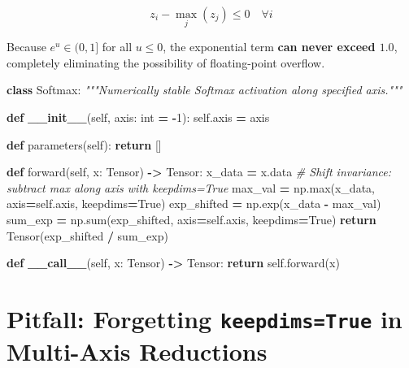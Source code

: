 \documentclass[
  letterpaper,
]{scrbook}
\newenvironment{Shaded}{\begin{snugshade}}{\end{snugshade}}
\newcommand{\BuiltInTok}[1]{#1}
\newcommand{\CommentTok}[1]{\textcolor[rgb]{0.56,0.35,0.01}{\textit{#1}}}
\newcommand{\ControlFlowTok}[1]{\textcolor[rgb]{0.13,0.29,0.53}{\textbf{#1}}}
\newcommand{\DecValTok}[1]{\textcolor[rgb]{0.00,0.00,0.81}{#1}}
\newcommand{\FunctionTok}[1]{\textcolor[rgb]{0.13,0.29,0.53}{\textbf{#1}}}
\newcommand{\KeywordTok}[1]{\textcolor[rgb]{0.13,0.29,0.53}{\textbf{#1}}}
\newcommand{\NormalTok}[1]{#1}
\newcommand{\OperatorTok}[1]{\textcolor[rgb]{0.81,0.36,0.00}{\textbf{#1}}}
\newcommand{\VariableTok}[1]{\textcolor[rgb]{0.00,0.00,0.00}{#1}}
\begin{document}
\[z_i - \max_j(z_j) \le 0 \quad \forall i\]

Because \(e^u \in (0, 1]\) for all \(u \le 0\), the exponential term
\textbf{can never exceed \(1.0\)}, completely eliminating the
possibility of floating-point overflow.

\begin{Shaded}
\begin{Highlighting}[]
\KeywordTok{class}\NormalTok{ Softmax:}
    \CommentTok{"""Numerically stable Softmax activation along specified axis."""}

    \KeywordTok{def} \FunctionTok{\_\_init\_\_}\NormalTok{(}\VariableTok{self}\NormalTok{, axis: }\BuiltInTok{int} \OperatorTok{=} \OperatorTok{{-}}\DecValTok{1}\NormalTok{):}
        \VariableTok{self}\NormalTok{.axis }\OperatorTok{=}\NormalTok{ axis}

    \KeywordTok{def}\NormalTok{ parameters(}\VariableTok{self}\NormalTok{):}
        \ControlFlowTok{return}\NormalTok{ []}

    \KeywordTok{def}\NormalTok{ forward(}\VariableTok{self}\NormalTok{, x: Tensor) }\OperatorTok{{-}\textgreater{}}\NormalTok{ Tensor:}
\NormalTok{        x\_data }\OperatorTok{=}\NormalTok{ x.data}
        \CommentTok{\# Shift invariance: subtract max along axis with keepdims=True}
\NormalTok{        max\_val }\OperatorTok{=}\NormalTok{ np.}\BuiltInTok{max}\NormalTok{(x\_data, axis}\OperatorTok{=}\VariableTok{self}\NormalTok{.axis, keepdims}\OperatorTok{=}\VariableTok{True}\NormalTok{)}
\NormalTok{        exp\_shifted }\OperatorTok{=}\NormalTok{ np.exp(x\_data }\OperatorTok{{-}}\NormalTok{ max\_val)}
\NormalTok{        sum\_exp }\OperatorTok{=}\NormalTok{ np.}\BuiltInTok{sum}\NormalTok{(exp\_shifted, axis}\OperatorTok{=}\VariableTok{self}\NormalTok{.axis, keepdims}\OperatorTok{=}\VariableTok{True}\NormalTok{)}
        \ControlFlowTok{return}\NormalTok{ Tensor(exp\_shifted }\OperatorTok{/}\NormalTok{ sum\_exp)}

    \KeywordTok{def} \FunctionTok{\_\_call\_\_}\NormalTok{(}\VariableTok{self}\NormalTok{, x: Tensor) }\OperatorTok{{-}\textgreater{}}\NormalTok{ Tensor:}
        \ControlFlowTok{return} \VariableTok{self}\NormalTok{.forward(x)}
\end{Highlighting}
\end{Shaded}

\section{\texorpdfstring{Pitfall: Forgetting \texttt{keepdims=True} in
Multi-Axis
Reductions}{Pitfall: Forgetting keepdims=True in Multi-Axis Reductions}}\label{pitfall-forgetting-keepdimstrue-in-multi-axis-reductions}
\end{document}
